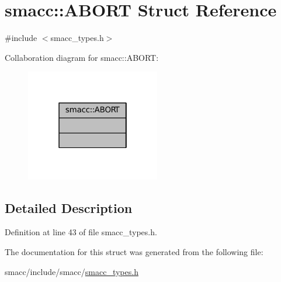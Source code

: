 \hypertarget{structsmacc_1_1ABORT}{}\section{smacc\+:\+:A\+B\+O\+RT Struct Reference}
\label{structsmacc_1_1ABORT}


{\ttfamily \#include $<$smacc\+\_\+types.\+h$>$}



Collaboration diagram for smacc\+:\+:A\+B\+O\+RT\+:
\nopagebreak
\begin{figure}[H]
\begin{center}
\leavevmode
\includegraphics[width=166pt]{structsmacc_1_1ABORT__coll__graph}
\end{center}
\end{figure}


\subsection{Detailed Description}


Definition at line 43 of file smacc\+\_\+types.\+h.



The documentation for this struct was generated from the following file\+:\begin{DoxyCompactItemize}
\item 
smacc/include/smacc/\hyperlink{smacc__types_8h}{smacc\+\_\+types.\+h}\end{DoxyCompactItemize}
